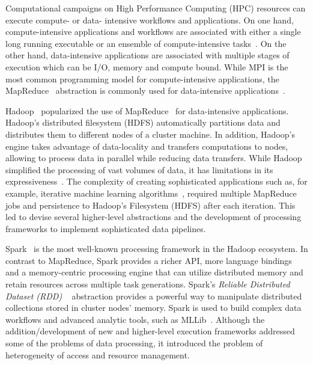 
Computational campaigns on High Performance Computing (HPC) resources can
execute compute- or data- intensive workflows and applications. On one hand,
compute-intensive applications and workflows are associated with either a single
long running executable or an ensemble of compute-intensive
tasks~\cite{balasubramanian2018harnessing}. On the other hand, data-intensive
applications are associated with multiple stages of execution which can be I/O,
memory and compute bound. While MPI is the most common programming model for
compute-intensive applications, the MapReduce~\cite{dean2004mapreduce}
abstraction is commonly used for data-intensive
applications~\cite{hellerstein2012science}.

Hadoop~\cite{hadoop} popularized the use of MapReduce~\cite{dean2004mapreduce}
for data-intensive applications. Hadoop's distributed filesystem (HDFS)
automatically partitions data and distributes them to different nodes of a
cluster machine. In addition, Hadoop's engine takes advantage of data-locality
and transfers computations to nodes, allowing to process data in parallel while
reducing data transfers. While Hadoop simplified the processing of vast volumes
of data, it has limitations in its
expressiveness~\cite{yelick2011magellan,isard2007dryad}. The complexity of
creating sophisticated applications such as, for example, iterative machine
learning algorithms~\cite{grolinger2014challenges}, required multiple MapReduce
jobs and persistence to Hadoop's Filesystem (HDFS) after each iteration. This
led to devise several higher-level abstractions and the development of
processing frameworks to implement sophisticated data pipelines.

Spark~\cite{zaharia2010spark} is the most well-known processing framework in the
Hadoop ecosystem. In contrast to MapReduce, Spark provides a richer API, more
language bindings and a memory-centric processing engine that can utilize
distributed memory and retain resources across multiple task generations.
Spark's \emph{Reliable Distributed Dataset (RDD)} ~\cite{zaharia2012resilient}
abstraction provides a powerful way to manipulate distributed collections stored
in cluster nodes' memory. Spark is used to build complex data workflows and
advanced analytic tools, such as MLLib~\cite{mllib}. Although the
addition/development of new and higher-level execution frameworks addressed some
of the problems of data processing, it introduced the problem of heterogeneity
of access and resource management.

